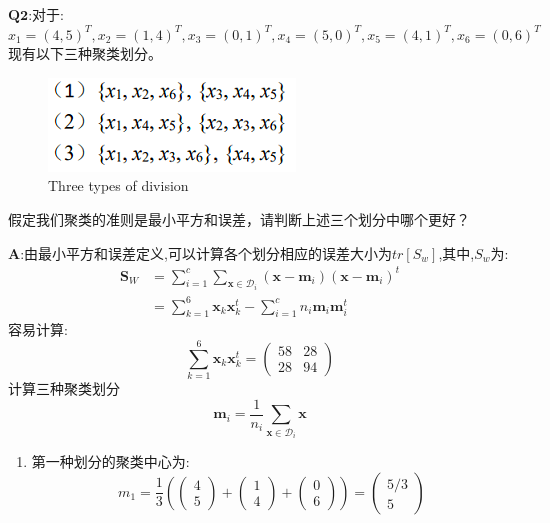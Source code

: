 \documentclass[homework]{IEEEtran}
\begin{document}
\begin{CJK}{UTF8}{gkai}
$\mathbf{Q2}$:对于:$x_1=(4,5)^T,x_2=(1,4)^T,x_3=(0,1)^T,x_4=(5,0)^T,x_5=(4,1)^T,x_6=(0,6)^T$现有以下三种聚类划分。\par
\begin{figure}[htb]
    \centerline{\includegraphics{Images/fig1.png}}
    \caption{Three types of division}
    \label{fig1}
    \end{figure}
假定我们聚类的准则是最小平方和误差，请判断上述三个划分中哪个更好？\par
$\mathbf{A}$:由最小平方和误差定义,可以计算各个划分相应的误差大小为$tr\left[S_w \right]$,其中,$S_w$为:
\begin{align*}
\mathbf{S}_{W}&=\sum_{i=1}^{c} \sum_{\mathbf{x} \in \mathcal{D}_{i}}\left(\mathbf{x}-\mathbf{m}_{i}\right)\left(\mathbf{x}-\mathbf{m}_{i}\right)^{t} \\
    &=\sum_{k=1}^{6} \mathbf{x}_{k} \mathbf{x}_{k}^{t}-\sum_{i=1}^{c} n_{i} \mathbf{m}_{i} \mathbf{m}_{i}^{t}
\end{align*}
容易计算:
$$
\sum_{k=1}^{6} \mathbf{x}_{k} \mathbf{x}_{k}^{t} = 
\left(\begin{array}{ll}58 & 28 \\ 28 & 94\end{array}\right)
$$ 
计算三种聚类划分
$$
\mathbf{m}_{i}=\frac{1}{n_{i}} \sum_{\mathbf{x} \in \mathcal{D}_{i}} \mathbf{x}
$$
\begin{enumerate}
    \item 第一种划分的聚类中心为:
    $$
    m_1 = \frac{1}{3} \left(
    \begin{pmatrix}4 \\ 5\end{pmatrix}+\begin{pmatrix}1 \\ 4\end{pmatrix}+\begin{pmatrix}0 \\ 6\end{pmatrix} \right)
    = \begin{pmatrix}5/3 \\ 5\end{pmatrix}
    $$


\end{enumerate}
\end{CJK}
\end{document}
